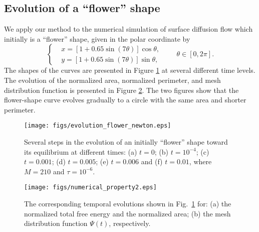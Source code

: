 \documentclass[review]{elsarticle}
\begin{document}
\subsection{Evolution of a ``flower'' shape}

We apply our method to the numerical simulation of surface diffusion flow which initially is a ``flower'' shape, given in the polar coordinate by
\begin{equation}
\left\{
\begin{aligned}
&x = \left[1 + 0.65\sin(7\theta)\right]\cos\theta,\\
&y = \left[1 + 0.65\sin(7\theta)\right]\sin\theta,
\end{aligned}
\right. \qquad  \theta\in[0, 2\pi].
\end{equation}
The shapes of the curves are presented in Figure \ref{fig:evolution_7flower} at several different time levels.
The evolution of the normalized area, normalized perimeter, and mesh distribution function is presented in Figure \ref{fig:numerical_property_7flower}.
The two figures show that the flower-shape curve evolves gradually to a circle with the same area and shorter perimeter.


\begin{figure}[htp!]
\centering
\texttt{[image: figs/evolution\_flower\_newton.eps]}
\caption{Several steps in the evolution of an initially ``flower'' shape toward its equilibrium at different times: (a) $t = 0$; (b) $t = 10^{-4}$; (c) $t = 0.001$; (d) $t = 0.005$; (e) $t = 0.006$ and (f) $t = 0.01$, where $M = 210$ and $\tau = 10^{-6}$.} \label{fig:evolution_7flower}
\end{figure}

\begin{figure}[htp!]
    \centering
    \texttt{[image: figs/numerical\_property2.eps]}
  \caption{The corresponding temporal evolutions shown in Fig.~\ref{fig:evolution_7flower} for: (a) the normalized total free energy and the normalized area; (b) the mesh distribution function $\Psi(t)$, respectively.}
  \label{fig:numerical_property_7flower}
\end{figure}
\end{document}
